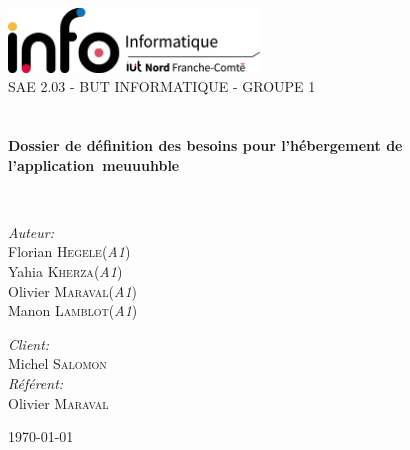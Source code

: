 \begin{titlepage}
\begin{center}

\includegraphics[width=0.5\textwidth]{./images/InfoLogoQuadriH.png}~\\[1cm]

\textsc{\LARGE SAE 2.03 - BUT INFORMATIQUE - GROUPE 1}\\[1.5cm]

\textsc{\Large }\\[0.5cm]

\HRule \\[0.4cm]

{\huge \bfseries Dossier de définition des besoins pour l'hébergement de l'application meuuuhble\\[0.4cm] }

\HRule \\[1.5cm]

\begin{minipage}{0.4\textwidth}
\begin{flushleft} \large
\emph{Auteur:}\\
Florian \textsc{Hegele}(\textit{A1})\\
Yahia \textsc{Kherza}(\textit{A1})\\
Olivier \textsc{Maraval}(\textit{A1})\\
Manon \textsc{Lamblot}(\textit{A1})\\
\end{flushleft}
\end{minipage}
\begin{minipage}{0.4\textwidth}
\begin{flushright} \large
\emph{Client:} \\
Michel \textsc{Salomon}\\
\emph{Référent:} \\
Olivier \textsc{Maraval}
\end{flushright}
\end{minipage}

\vfill

{\large \today}

\end{center}
\end{titlepage}